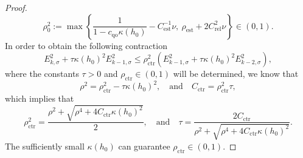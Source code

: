 \documentclass[preprint,times]{elsarticle}%
\numberwithin{algorithm}{section}
\numberwithin{equation}{section}
\newcommand{\rel}{\mathrm{rel}}
\newcommand{\est}{\mathrm{est}}
\newcommand{\ctr}{\mathrm{ctr}}
\newcommand{\qoo}{\mathrm{qo}}
\def\leq{\leqslant}
\begin{document}
\begin{proof}
	\begin{equation*}
		\rho_0^2 := \max\left\{\dfrac{1}{1-c_\qoo \kappa(h_0)} - C_\est^{-1}\nu,~\rho_\est + 2C_\rel^2 \nu\right\} \in (0,1).
	\end{equation*}	
In order to obtain the following contraction 
	\begin{equation*}
		E_{k,\sigma}^2 + \tau \kappa(h_0)^2 E_{k-1,\sigma}^2 \leq \rho_\ctr^2 \left(E_{k-1,\sigma}^2 + \tau\kappa(h_0)^2 E_{k-2,\sigma}^2\right), 
	\end{equation*}
where the constants $\tau > 0$ and $\rho_\ctr \in (0,1)$ will be determined, we know that 
	\begin{equation*}
		\rho^2 = \rho_\ctr^2 - \tau \kappa(h_0)^2, \quad\text{and}\quad C_\ctr = \rho_\ctr^2 \tau, 
	\end{equation*}
which implies that 
	\begin{equation*}
		\rho_\ctr^2 = \dfrac{\rho^2 + \sqrt{\rho^4 + 4C_\ctr \kappa(h_0)^2}}{2}, 
		\quad \text{and} \quad \tau = \dfrac{2C_\ctr}{\rho^2 + \sqrt{\rho^4 + 4C_\ctr \kappa(h_0)^2}}. 
	\end{equation*}
The sufficiently small $\kappa(h_0)$ can guarantee $\rho_\ctr \in (0,1)$. 
\end{proof}
\end{document}
